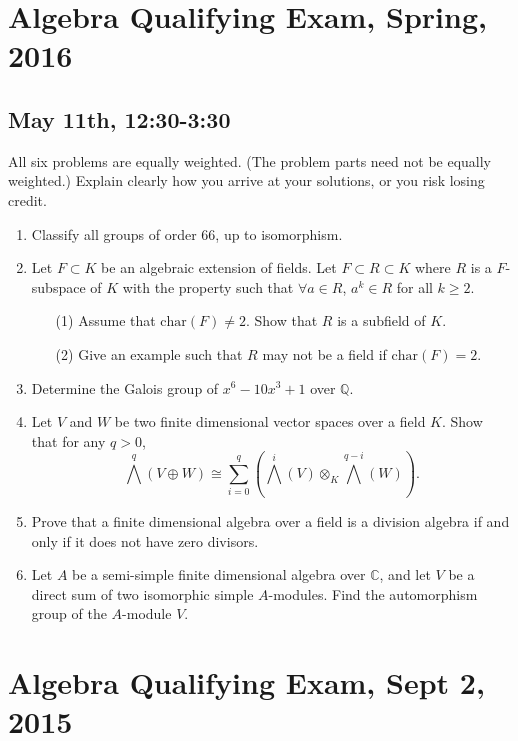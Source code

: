 \documentclass{article}
\begin{document}
\section*{Algebra Qualifying Exam, Spring, 2016}
\subsection*{May 11th, 12:30-3:30}

All six problems are equally weighted. (The problem parts need not be equally weighted.) Explain clearly how you arrive at your solutions, or you risk losing credit.

\begin{enumerate}
    \item Classify all groups of order 66, up to isomorphism.

    \item Let \(F\subset K\) be an algebraic extension of fields. Let \(F\subset R\subset K\) where \(R\) is a \(F\)-subspace of \(K\) with the property such that \(\forall a\in R\), \(a^{k}\in R\) for all \(k\geq 2\).
    \begin{itemize}
        \item[(1)] Assume that \(\text{char}(F)\neq 2\). Show that \(R\) is a subfield of \(K\).
        \item[(2)] Give an example such that \(R\) may not be a field if \(\text{char}(F)=2\).
    \end{itemize}

    \item Determine the Galois group of \(x^{6}-10x^{3}+1\) over \(\mathbb{Q}\).

    \item Let \(V\) and \(W\) be two finite dimensional vector spaces over a field \(K\). Show that for any \(q>0\),
    \[\bigwedge^{q}(V\oplus W)\cong\sum_{i=0}^{q}(\bigwedge^{i}(V)\otimes_{K}\bigwedge^{q-i}(W)).\]

    \item Prove that a finite dimensional algebra over a field is a division algebra if and only if it does not have zero divisors.

    \item Let \(A\) be a semi-simple finite dimensional algebra over \(\mathbb{C}\), and let \(V\) be a direct sum of two isomorphic simple \(A\)-modules. Find the automorphism group of the \(A\)-module \(V\).
\end{enumerate}

\section*{Algebra Qualifying Exam, Sept 2, 2015}
\end{document}
